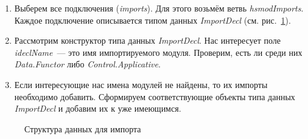 \begin{enumerate}
\item Выберем все подключения (\textit{imports}). Для этого возьмём ветвь \textit{hsmodImports}. Каждое подключение описывается типом данных \textit{ImportDecl} (см. рис.~\ref{import}).
\item Рассмотрим конструктор типа данных \textit{ImportDecl}. Нас интересует поле \textit{ideclName}~--- это имя импортируемого модуля. Проверим, есть ли среди них \textit{Data.Functor} либо \textit{Control.Applicative}.
\item Если интересующие нас имена модулей не найдены, то их импорты необходимо добавить. Сформируем соответствующие объекты типа данных \textit{ImportDecl} и добавим их к уже имеющимся.
\end{enumerate}

\begin{figure}[h]
\caption{Структура данных для импорта}\label{import}
\end{figure}


